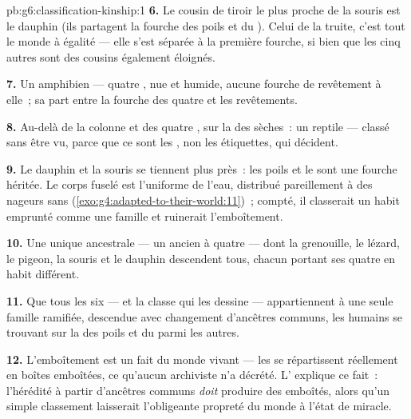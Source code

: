 \begin{solution}{pb:g6:classification-kinship:1}
\textbf{6.} Le cousin de tiroir le plus proche de la souris est le
dauphin (ils partagent la fourche des poils et du ). Celui de la
truite, c'est tout le monde à égalité --- elle s'est séparée à la
première fourche, si bien que les cinq autres sont des cousins
également éloignés.

\textbf{7.} Un amphibien --- quatre ,  nue et humide,
aucune fourche de revêtement à elle~; sa  part entre la
fourche des quatre  et les revêtements.

\textbf{8.} Au-delà de la colonne et des quatre , sur la
 des  sèches~: un reptile --- classé sans être vu,
parce que ce sont les , non les étiquettes, qui décident.

\textbf{9.} Le dauphin et la souris se tiennent plus près~: les
poils et le  sont une fourche héritée. Le corps fuselé est
l'uniforme de l'eau, distribué pareillement à des nageurs sans
 (\cref{exo:g4:adapted-to-their-world:11})~; compté, il
classerait un habit emprunté comme une famille et ruinerait
l'emboîtement.

\textbf{10.} Une unique  ancestrale --- un ancien  à
quatre  --- dont la grenouille, le lézard, le pigeon, la
souris et le dauphin descendent tous, chacun portant ses quatre
 en habit différent.

\textbf{11.} Que tous les six --- et la classe qui les dessine ---
appartiennent à une seule famille ramifiée, descendue avec
changement d'ancêtres communs, les humains se trouvant sur la
 des poils et du  parmi les autres.

\textbf{12.} L'emboîtement est un fait du monde vivant --- les
 se répartissent réellement en boîtes emboîtées, ce
qu'aucun archiviste n'a décrété. L' explique ce fait~:
l'hérédité à partir d'ancêtres communs \emph{doit} produire des
 emboîtés, alors qu'un simple classement laisserait
l'obligeante propreté du monde à l'état de miracle.
\end{solution}

